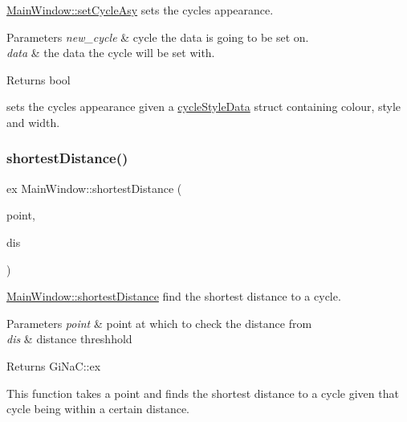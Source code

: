 \mbox{\hyperlink{class_main_window_a633c8594fbb906b2e914a4b3bbf50d97}{Main\+Window\+::set\+Cycle\+Asy}} sets the cycles appearance. 


\begin{DoxyParams}{Parameters}
{\em new\+\_\+cycle} & cycle the data is going to be set on. \\
\hline
{\em data} & the data the cycle will be set with. \\
\hline
\end{DoxyParams}
\begin{DoxyReturn}{Returns}
bool
\end{DoxyReturn}
sets the cycles appearance given a \mbox{\hyperlink{structcycle_style_data}{cycle\+Style\+Data}} struct containing colour, style and width. \mbox{\label{class_main_window_a2431b3144405d8d0d3e8bd3523ad381b}} 
\subsubsection{\texorpdfstring{shortest\+Distance()}{shortestDistance()}}
{\footnotesize\ttfamily ex Main\+Window\+::shortest\+Distance (\begin{DoxyParamCaption}\item[{Q\+PointF}]{point,  }\item[{double}]{dis }\end{DoxyParamCaption})}



\mbox{\hyperlink{class_main_window_a2431b3144405d8d0d3e8bd3523ad381b}{Main\+Window\+::shortest\+Distance}} find the shortest distance to a cycle. 


\begin{DoxyParams}{Parameters}
{\em point} & point at which to check the distance from \\
\hline
{\em dis} & distance threshhold \\
\hline
\end{DoxyParams}
\begin{DoxyReturn}{Returns}
Gi\+Na\+C\+::ex
\end{DoxyReturn}
This function takes a point and finds the shortest distance to a cycle given that cycle being within a certain distance. \mbox{\label{class_main_window_a128f71880d4b9683149023fc46fcc9f8}} 
